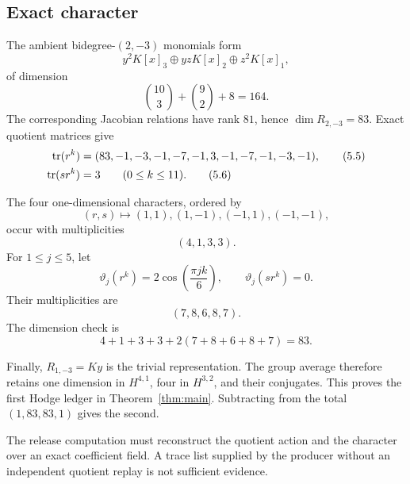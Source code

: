\subsection{Exact character}

The ambient bidegree-\((2,-3)\) monomials form
\[
 y^2K[x]_3\oplus yzK[x]_2\oplus z^2K[x]_1,
\]
of dimension
\[
 \binom{10}{3}+\binom92+8=164.
\]
The corresponding Jacobian relations have rank \(81\), hence
\(\dim R_{2,-3}=83\).  Exact quotient matrices give
\begin{align}
 \operatorname{tr}(r^k)
 &=(83,-1,-3,-1,-7,-1,3,-1,-7,-1,-3,-1),
                                                        \tag{5.5}\\
 \operatorname{tr}(sr^k)&=3\qquad(0\le k\le11).                       \tag{5.6}
\end{align}

The four one-dimensional characters, ordered by
\[
 (r,s)\longmapsto(1,1),(1,-1),(-1,1),(-1,-1),
\]
occur with multiplicities
\[
 (4,1,3,3).                                        \tag{5.7}
\]
For \(1\le j\le5\), let
\[
 \vartheta_j(r^k)=2\cos\left(\frac{\pi jk}{6}\right),
 \qquad \vartheta_j(sr^k)=0.
\]
Their multiplicities are
\[
 (7,8,6,8,7).                                      \tag{5.8}
\]
The dimension check is
\[
 4+1+3+3+2(7+8+6+8+7)=83.
\]

Finally, \(R_{1,-3}=Ky\) is the trivial representation.  The group
average therefore retains one dimension in \(H^{4,1}\), four in
\(H^{3,2}\), and their conjugates.  This proves the first Hodge ledger
in Theorem~\ref{thm:main}.  Subtracting from the total
\((1,83,83,1)\) gives the second.

\begin{remark}
The release computation must reconstruct the quotient action and the
character over an exact coefficient field.  A trace list supplied by
the producer without an independent quotient replay is not sufficient
evidence.
\end{remark}
